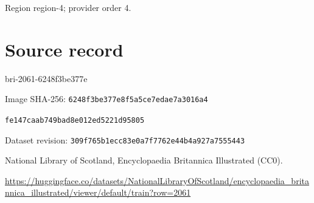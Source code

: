 \documentclass[11pt]{article}
\begin{document}
{\scriptsize\color{gray} Region region-4; provider order 4.\par}
\medskip
\newpage\section*{Source record}
bri-2061-6248f3be377e\par
Image SHA-256: \texttt{6248f3be377e8f5a5ce7edae7a3016a4}\par\texttt{fe147caab749bad8e012ed5221d95805}\par
Dataset revision: \texttt{309f765b1ecc83e0a7f7}\texttt{762e44b4a927a7555443}\par
National Library of Scotland, Encyclopaedia Britannica Illustrated (CC0).\par
\url{https://huggingface.co/datasets/NationalLibraryOfScotland/encyclopaedia_britannica_illustrated/viewer/default/train?row=2061}
\end{document}

